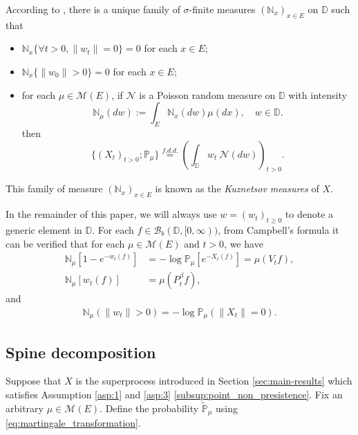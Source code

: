 \documentclass[12pt,a4paper]{amsart}
\numberwithin{equation}{section}
\theoremstyle{plain}
\theoremstyle{definition}
\begin{document}
According to \cite[Section 8.4]{Li2011Measurevalued}, there is a unique family of $\sigma$-finite measures $(\mathbb N_x)_{x\in E}$ on $\mathbb D$ such that
\begin{itemize}
\item
  $\mathbb N_x \{\forall t > 0, \|w_t\| =0\} =0$ for each $x\in E$;
\item
  $\mathbb N_x \{ \|w_0\| > 0\} = 0$ for each $x\in E$;
\item
  for each $\mu \in \mathcal M(E)$, if $\mathcal N$ is a Poisson random measure on $\mathbb D$ with intensity
  \[
    \mathbb N_\mu(dw):= \int_E \mathbb N_x(dw)\mu(dx), \quad w\in \mathbb D.
  \]
	then
  \[
    \{(X_t)_{t> 0};\mathbb P_\mu\}
    \overset{f.d.d.}{=} \left(\int_{\mathbb D} w_t~\mathcal N(dw)\right)_{t> 0}.
  \]
\end{itemize}
This family of measure $(\mathbb N_x)_{x\in E}$ is known as the \emph{Kuznetsov measures} of $X$.


In the remainder of this paper, we will always use $w = (w_t)_{t\geq 0}$ to denote a generic element in $\mathbb D$.
For each $f\in \mathcal B_b(\mathbb D, [0,\infty))$, from Campbell's formula it can be verified that for each $\mu\in \mathcal M(E)$ and $t>0$, we have
\begin{align}\label{eq: kuznetsov Laplace}
 	\mathbb N_\mu[1-e^{-w_t(f) }]
 	&=-\log \mathbb P_\mu[e^{-X_t(f)}] 
    = \mu(V_t f),
 	\\ \mathbb N_\mu[w_t(f)]
 	&=\mu(P_t^{\beta}f),
\end{align}
and
\begin{align}
 	\mathbb N_\mu( \|w_t\| > 0)
 	=-\log\mathbb P_\mu( \| X_t\|= 0).
\end{align}
\subsection{Spine decomposition}
Suppose that $X$ is the superprocess introduced in Section \ref{sec:main-results} which satisfies Assumption \ref{asp:1} and \ref{asp:3} \eqref{subsup:point_non_presistence}.
Fix an arbitrary $\mu\in \mathcal M(E)$.
Define the probability $\widetilde {\mathbb P}_\mu$ using \eqref{eq:martingale_transformation}.
\end{document}
